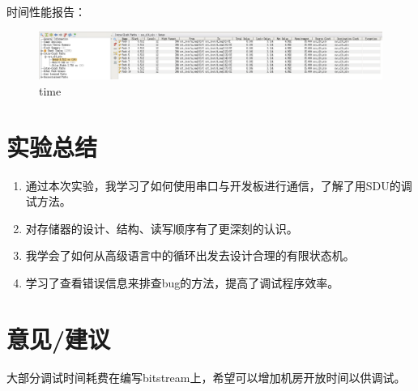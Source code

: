 \documentclass[a4paper]{article}
\begin{document}
时间性能报告：
\begin{figure}[H]
    \centering
    \includegraphics[width=1.0\textwidth]{time.png}
    \caption{time}
    \label{fig:time}
  \end{figure}


\section {实验总结}
\begin{enumerate}
  \item 通过本次实验，我学习了如何使用串口与开发板进行通信，了解了用SDU的调试方法。
  \item 对存储器的设计、结构、读写顺序有了更深刻的认识。
  \item 我学会了如何从高级语言中的循环出发去设计合理的有限状态机。
  \item 学习了查看错误信息来排查bug的方法，提高了调试程序效率。
\end{enumerate}
\section {意见/建议}
大部分调试时间耗费在编写bitstream上，希望可以增加机房开放时间以供调试。
\end{document}
